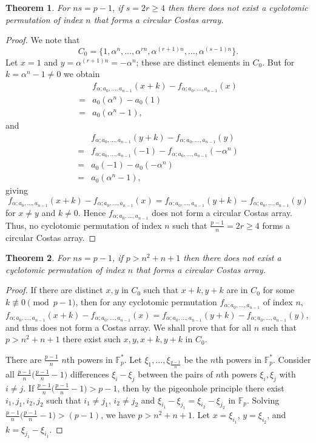 \documentclass[10pt]{amsart}
\newtheorem{theorem}{Theorem}
\begin{document}
\begin{theorem} \label{evens}
For $ns=p-1$, if $s=2r \geq 4$
then there does not exist a cyclotomic permutation
of index $n$ that forms a circular Costas array.
\end{theorem}
\begin{proof}
We note that
\[
C_0=\big \{1,\alpha^n,\ldots,\alpha^{rn},
\alpha^{(r+1)n},\ldots,
\alpha^{(s-1)n} \big \}.
\]
Let $x=1$ and $y=\alpha^{(r+1)n}=-\alpha^n$; these are distinct
elements in $C_0$. But for $k=\alpha^n-1 \neq 0$ we obtain
\[
\begin{split}
&f_{\alpha;a_0,\ldots,a_{n-1}}(x+k)-f_{\alpha;a_0,\ldots,a_{n-1}}(x)\\
=&a_0(\alpha^n)-a_0(1)\\
=&a_0(\alpha^n-1),
\end{split}
\]
and
\[
\begin{split}
&f_{\alpha;a_0,\ldots,a_{n-1}}(y+k)-f_{\alpha;a_0,\ldots,a_{n-1}}(y)\\
=&f_{\alpha;a_0,\ldots,a_{n-1}}(-1)-f_{\alpha;a_0,\ldots,a_{n-1}}(-\alpha^n)\\
=&a_0(-1)-a_0(-\alpha^n)\\
=&a_0(\alpha^n-1),
\end{split}
\]
giving
\[
f_{\alpha;a_0,\ldots,a_{n-1}}(x+k)-f_{\alpha;a_0,\ldots,a_{n-1}}(x)=
f_{\alpha;a_0,\ldots,a_{n-1}}(y+k)-f_{\alpha;a_0,\ldots,a_{n-1}}(y)
\]
 for $x \neq y$ and $k \neq 0$.
Hence $f_{\alpha;a_0,\ldots,a_{n-1}}$ does not form a circular Costas array.
Thus, no cyclotomic permutation of index $n$ such that
$\frac{p-1}{n}=2r \geq 4$ forms a circular Costas array.
\end{proof}

\begin{theorem} \label{largep}
For $ns=p-1$, if $p>n^2+n+1$ then there does not exist a
cyclotomic permutation of index $n$ that forms a circular Costas array.
\end{theorem}
\begin{proof}
If there are distinct $x,y$ in $C_0$ such that
$x+k,y+k$ are in $C_0$ for some $k \not \equiv 0 \pmod{p-1}$, then
for any cyclotomic permutation $f_{\alpha;a_0,\ldots,a_{n-1}}$ of index $n$,
$f_{\alpha;a_0,\ldots,a_{n-1}}(x+k)-f_{\alpha;a_0,\ldots,a_{n-1}}(x)=
f_{\alpha;a_0,\ldots,a_{n-1}}(y+k)-f_{\alpha;a_0,\ldots,a_{n-1}}(y)$,
and thus does not form
a Costas array.
We shall prove that for all $n$ such that $p>n^2+n+1$ there exist
such $x,y,x+k,y+k$ in $C_0$.

There are $\frac{p-1}{n}$ $n$th powers in $\mathbb{F}_p^*$. Let
$\xi_1,\ldots,\xi_{\frac{p-1}{n}}$ be the $n$th powers in
$\mathbb{F}_p^*$. Consider all
$\frac{p-1}{n}\big(\frac{p-1}{n} - 1\big)$ differences $\xi_i -\xi_j$
between the pairs of $n$th powers $\xi_i, \xi_j$ with
$i\neq j$. If $\frac{p-1}{n}\big(\frac{p-1}{n} - 1\big)
>p-1$, then by the pigeonhole principle there exist $i_1, j_1, i_2,
j_2$ such that $i_1 \neq j_1$, $i_2 \neq j_2$
and $\xi_{i_1} -\xi_{j_1} = \xi_{i_2} -\xi_{j_2}$ in $\mathbb{F}_p$.
Solving $\frac{p-1}{n}\big(\frac{p-1}{n} -1\big)
> (p-1)$,
we have $p > n^2 + n +1$.
Let
$x=\xi_{i_1}$, $y =\xi_{i_2}$, and $k=\xi_{j_1} -\xi_{i_1}$.
\end{proof}
\end{document}
